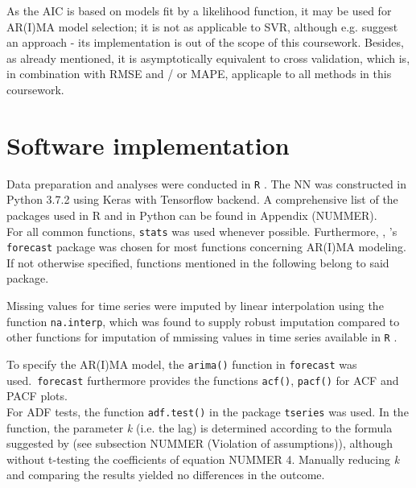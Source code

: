 \documentclass[a4paper, 11pt]{article}
\begin{document}
As the AIC is based on models fit by a likelihood function, it may be used for AR(I)MA model selection; it is not as applicable to SVR, although e.g. \cite{Demyanov.2012} suggest an approach - its implementation is out of the scope of this coursework. Besides, as already mentioned, it is asymptotically equivalent to cross validation, which is, in combination with RMSE and / or MAPE, applicaple to all methods in this coursework. \\

\section{Software implementation}

Data preparation and analyses were conducted in \texttt{R} \citep{Team.2013}. The NN was constructed in Python 3.7.2 using Keras \citep{chollet2015keras} with Tensorflow \citep{tensorflow2015-whitepaper} backend. A comprehensive list of the packages used in R and in Python can be found in Appendix (NUMMER).\\

For all common functions, \texttt{stats} was used whenever possible. Furthermore, , \cite{Hyndman.2008}'s  \texttt{forecast} package was chosen for most functions concerning AR(I)MA modeling. If not otherwise specified, functions mentioned in the following belong to said package.

Missing values for time series were imputed by linear interpolation using the function \texttt{na.interp}, which was found to supply robust imputation compared to other functions for imputation of mmissing values in time series available in \texttt{R} \citep{Moritz2015ComparisonOD}. 

To specify the AR(I)MA model, the \texttt{arima()} function in \texttt{forecast} was used.\
\texttt{forecast} furthermore provides the functions \texttt{acf()}, \texttt{pacf()} for ACF and PACF plots. \\
For ADF tests, the function \texttt {adf.test()} in the package \texttt{tseries} was used. In the function, the parameter \textit{k} (i.e. the lag) is determined according to the formula suggested by \cite{Vogel.2015} (see subsection NUMMER (Violation of assumptions)), although without t-testing the coefficients of equation NUMMER 4. Manually reducing \textit{k} and comparing the results yielded no differences in the outcome.\\
\end{document}
